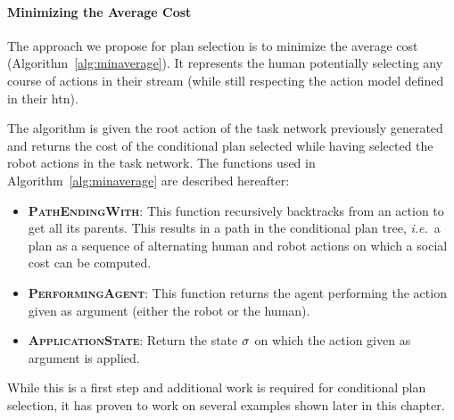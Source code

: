 \documentclass[a4paper,11pt,twoside]{StyleThese}
\begin{document}
\paragraph{Minimizing the Average Cost}
The approach we propose for plan selection is to minimize the average cost (Algorithm~\ref{alg:minaverage}). It represents the human potentially selecting any course of actions in their stream (while still respecting the action model defined in their \acrshort{htn}).

The algorithm is given the root action of the task network previously generated and returns the cost of the conditional plan selected while having selected the robot actions in the task network. The functions used in Algorithm~\ref{alg:minaverage} are described hereafter:

\begin{itemize}
\item \textbf{\textsc{PathEndingWith}}: This function recursively backtracks from an action to get all its parents. This results in a path in the conditional plan tree, \textit{i.e.}~a plan as a sequence of alternating human and robot actions on which a social cost can be computed.

\item \textbf{\textsc{PerformingAgent}}: This function returns the agent performing the action given as argument (either the robot or the human).

\item \textbf{\textsc{ApplicationState}}: Return the state $\sigma$ on which the action given as argument is applied.
\end{itemize}

While this is a first step and additional work is required for conditional plan selection, it has proven to work on several examples shown later in this chapter.
\end{document}
